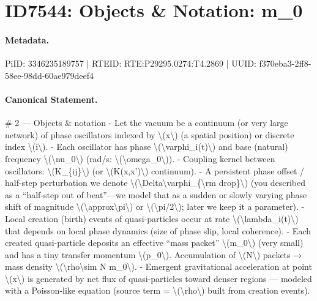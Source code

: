 \section*{ID7544: Objects \& Notation: m\_0}
\paragraph{Metadata.}
PiID: 3346235189757 | RTEID: RTE:P29295.0274:T4.2869 | UUID: f370eba3-2ff8-58ee-98dd-60ae979deef4

\paragraph{Canonical Statement.}
\# 2 — Objects \& notation - Let the vacuum be a continuum (or very large network) of phase oscillators indexed by \textbackslash{}(x\textbackslash{}) (a spatial position) or discrete index \textbackslash{}(i\textbackslash{}). - Each oscillator has phase \textbackslash{}(\textbackslash{}varphi\_i(t)\textbackslash{}) and base (natural) frequency \textbackslash{}(\textbackslash{}nu\_0\textbackslash{}) (rad/s: \textbackslash{}(\textbackslash{}omega\_0\textbackslash{})). - Coupling kernel between oscillators: \textbackslash{}(K\_\{ij\}\textbackslash{}) (or \textbackslash{}(K(x,x')\textbackslash{}) continuum). - A persistent phase offset / half-step perturbation we denote \textbackslash{}(\textbackslash{}Delta\textbackslash{}varphi\_\{\textbackslash{}rm drop\}\textbackslash{}) (you described as a “half-step out of beat”—we model that as a sudden or slowly varying phase shift of magnitude \textbackslash{}(\textbackslash{}approx\textbackslash{}pi\textbackslash{}) or \textbackslash{}(\textbackslash{}pi/2\textbackslash{}); later we keep it a parameter). - Local creation (birth) events of quasi-particles occur at rate \textbackslash{}(\textbackslash{}lambda\_i(t)\textbackslash{}) that depends on local phase dynamics (size of phase slip, local coherence). - Each created quasi-particle deposits an effective “mass packet” \textbackslash{}(m\_0\textbackslash{}) (very small) and has a tiny transfer momentum \textbackslash{}(p\_0\textbackslash{}). Accumulation of \textbackslash{}(N\textbackslash{}) packets → mass density \textbackslash{}(\textbackslash{}rho\textbackslash{}sim N m\_0\textbackslash{}). - Emergent gravitational acceleration at point \textbackslash{}(x\textbackslash{}) is generated by net flux of quasi-particles toward denser regions — modeled with a Poisson-like equation (source term = \textbackslash{}(\textbackslash{}rho\textbackslash{}) built from creation events).

